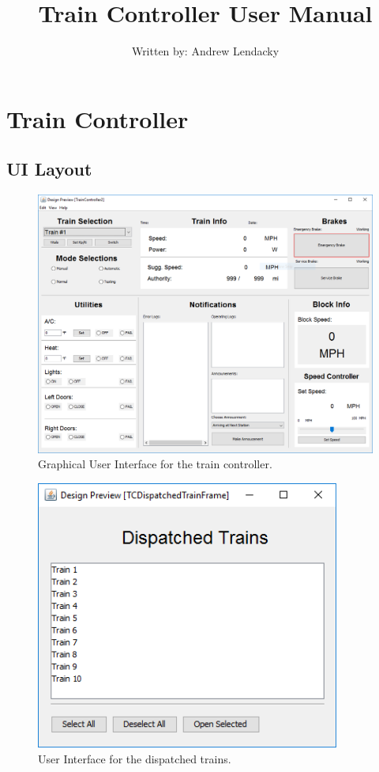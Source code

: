 \documentclass[letterpaper]{article}
\begin{document}
\title{Train Controller User Manual}
\author{Written by: Andrew Lendacky}
\date{}

\maketitle


\section{Train Controller}

\subsection{UI Layout}

\begin{figure}[h!]
	\center
	\includegraphics[width=16cm]{traincontroller_gui.PNG}
	\caption{Graphical User Interface for the train controller.}
\end{figure}

\begin{figure}[h!]
	\center
	\includegraphics[width=10cm]{traincontroller_dispatchedtrains.PNG}
	\caption{User Interface for the dispatched trains.}
\end{figure}
\end{document}
